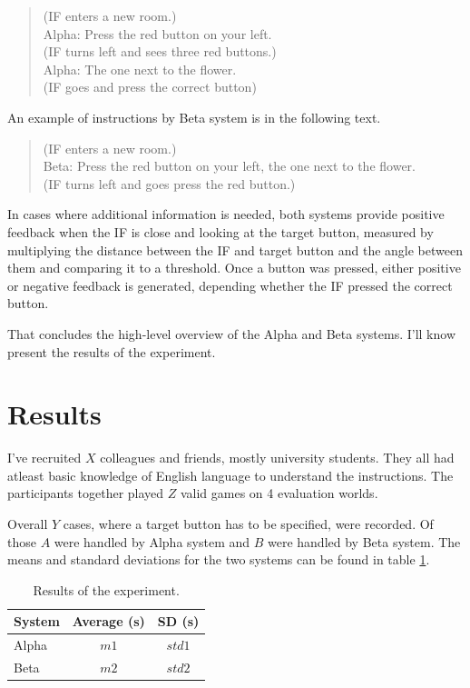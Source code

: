 \begin{verse}
(IF enters a new room.)\\
Alpha: Press the red button on your left.\\
(IF turns left and sees three red buttons.)\\
Alpha: The one next to the flower.\\
(IF goes and press the correct button)\\
\end{verse}

An example of instructions by Beta system is in the following text. 

\begin{verse}
(IF enters a new room.)\\
Beta: Press the red button on your left, the one next to the flower.\\
(IF turns left and goes press the red button.)\\
\end{verse}

In cases where additional information is needed, both systems provide positive feedback when the IF is close and looking at the target button, measured by multiplying the distance between the IF and target button and the angle between them and comparing it to a threshold. Once a button was pressed, either positive or negative feedback is generated, depending whether the IF pressed the correct button.

That concludes the high-level overview of the Alpha and Beta systems. I'll know present the results of the experiment.

\section{Results}
I've recruited $X$ colleagues and friends, mostly university students. They all had atleast basic knowledge of English language to understand the instructions. The participants together played $Z$ valid games on 4 evaluation worlds.

Overall $Y$ cases, where a target button has to be specified, were recorded. Of those $A$ were handled by Alpha system and $B$ were handled by Beta system. The means and standard deviations for the two systems can be found in table \ref{tab:meanexper}.

\begin{table}[!htbp]
 \centering
\begin{tabular}{lcc}
\toprule
System   & Average (s) & SD (s)  \\
\midrule
Alpha   & $m1$ & $std1$ \\
Beta 	& $m2$ & $std2$ \\
\bottomrule
\end{tabular}
\caption{Results of the experiment.}
\label{tab:meanexper}
\end{table}

